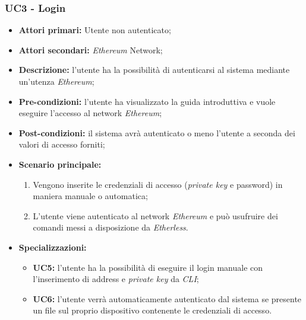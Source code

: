\subsubsection{UC3 - Login}
\begin{itemize}
	\item \textbf{Attori primari:} Utente non autenticato;
	\item \textbf{Attori secondari:} \textit{Ethereum\glo} Network;
	\item \textbf{Descrizione:} l'utente ha la possibilità di autenticarsi al sistema mediante un'utenza \textit{Ethereum\glos}; 
	\item \textbf{Pre-condizioni:} l'utente ha visualizzato la guida introduttiva e vuole eseguire l'accesso al network \textit{Ethereum\glos};
	\item \textbf{Post-condizioni:} il sistema avrà autenticato o meno l'utente a seconda dei valori di accesso forniti;
	\item \textbf{Scenario principale:} 
	\begin{enumerate}
		\item Vengono inserite le credenziali di accesso (\textit{private key\glos} e password) in maniera manuale o automatica;
		\item L'utente viene autenticato al network \textit{Ethereum\glo} e può usufruire dei comandi messi a disposizione da \textit{Etherless}.
	\end{enumerate}
	\item \textbf{Specializzazioni:}
	\begin{itemize}
		\item \textbf{UC5:} l'utente ha la possibilità di eseguire il login manuale con l'inserimento di address e \textit{private key\glo} da \textit{CLI\glos};
		\item \textbf{UC6:} l'utente verrà automaticamente autenticato dal sistema se presente un file sul proprio dispositivo contenente le credenziali di accesso.  
	\end{itemize}
\end{itemize}
